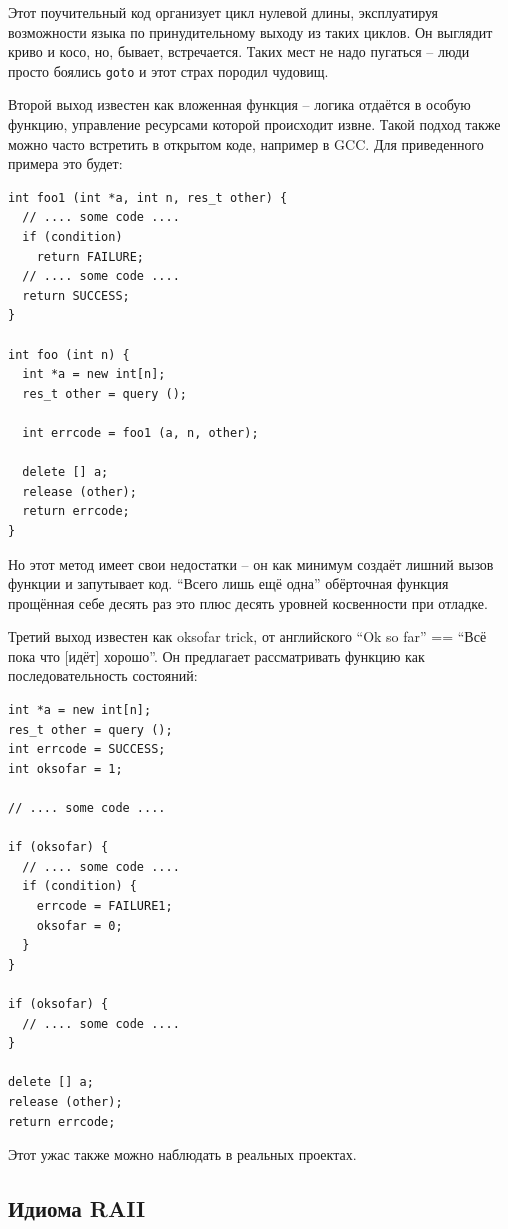 \documentclass[a4paper,12pt,oneside]{book}
\begin{document}
Этот поучительный код организует цикл нулевой длины, эксплуатируя возможности языка по принудительному выходу из таких циклов. Он выглядит криво и косо, но, бывает, встречается. Таких мест не надо пугаться -- люди просто боялись \lstinline!goto! и этот страх породил чудовищ.

Второй выход известен как вложенная функция -- логика отдаётся в особую функцию, управление ресурсами которой происходит извне. Такой подход также можно часто встретить в открытом коде, например в GCC. Для приведенного примера это будет:

\begin{lstlisting}
int foo1 (int *a, int n, res_t other) {
  // .... some code ....
  if (condition)
    return FAILURE;
  // .... some code ....
  return SUCCESS;
}

int foo (int n) {
  int *a = new int[n];
  res_t other = query ();

  int errcode = foo1 (a, n, other);

  delete [] a;
  release (other);
  return errcode;
}

\end{lstlisting}

Но этот метод имеет свои недостатки – он как минимум создаёт лишний вызов функции и запутывает код. ``Всего лишь ещё одна'' обёрточная функция прощённая себе десять раз это плюс десять уровней косвенности при отладке.

Третий выход известен как oksofar trick, от английского ``Ok so far'' == ``Всё пока что [идёт] хорошо''. Он предлагает рассматривать функцию как последовательность состояний:

\begin{lstlisting}
int *a = new int[n];
res_t other = query ();
int errcode = SUCCESS;
int oksofar = 1;

// .... some code ....

if (oksofar) {
  // .... some code ....
  if (condition) {
    errcode = FAILURE1;
    oksofar = 0;
  }
}

if (oksofar) {
  // .... some code ....
}

delete [] a;
release (other);
return errcode;
\end{lstlisting}

Этот ужас также можно наблюдать в реальных проектах.

\subsection{Идиома RAII}\label{RAII}
\end{document}
